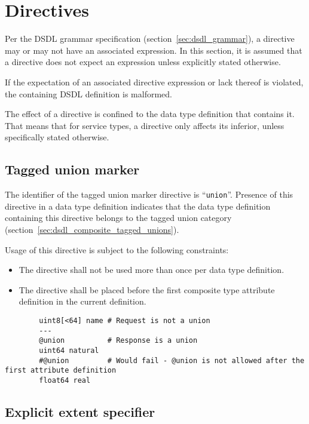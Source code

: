\section{Directives}\label{sec:dsdl_directives}

Per the DSDL grammar specification (section~\ref{sec:dsdl_grammar}),
a directive may or may not have an associated expression.
In this section, it is assumed that a directive does not expect an expression unless explicitly stated otherwise.

If the expectation of an associated directive expression or lack thereof is violated,
the containing DSDL definition is malformed.

The effect of a directive is confined to the data type definition that contains it.
That means that for service types, a directive only affects its inferior,
unless specifically stated otherwise.

\subsection{Tagged union marker}

The identifier of the tagged union marker directive is ``\verb|union|''.
Presence of this directive in a data type definition indicates that the
data type definition containing this directive belongs to the tagged union category
(section~\ref{sec:dsdl_composite_tagged_unions}).

Usage of this directive is subject to the following constraints:
\begin{itemize}
    \item The directive shall not be used more than once per data type definition.
    \item The directive shall be placed before the first composite type attribute definition in the current definition.
\end{itemize}

\begin{remark}
    \begin{verbatim}
        uint8[<64] name # Request is not a union
        ---
        @union          # Response is a union
        uint64 natural
        #@union         # Would fail - @union is not allowed after the first attribute definition
        float64 real
    \end{verbatim}
\end{remark}

\subsection{Explicit extent specifier}\label{sec:dsdl_directive_extent}


